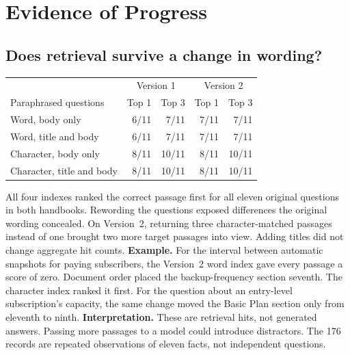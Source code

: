 \documentclass[10pt,letterpaper]{article}
\begin{document}
\section{Evidence of Progress}
\subsection{Does retrieval survive a change in wording?}
\begin{center}
\begin{tabular}{lrrrr}\toprule
 & \multicolumn{2}{c}{Version 1} & \multicolumn{2}{c}{Version 2}\\
Paraphrased questions & Top 1 & Top 3 & Top 1 & Top 3\\\midrule
Word, body only & 6/11 & 7/11 & 7/11 & 7/11\\
Word, title and body & 6/11 & 7/11 & 7/11 & 7/11\\
Character, body only & 8/11 & 10/11 & 8/11 & 10/11\\
Character, title and body & 8/11 & 10/11 & 8/11 & 10/11\\\bottomrule
\end{tabular}
\end{center}
All four indexes ranked the correct passage first for all eleven original questions in both handbooks. Rewording the questions exposed differences the original wording concealed. On Version~2, returning three character-matched passages instead of one brought two more target passages into view. Adding titles did not change aggregate hit counts.
\textbf{Example.} For the interval between automatic snapshots for paying subscribers, the Version~2 word index gave every passage a score of zero. Document order placed the backup-frequency section seventh. The character index ranked it first. For the question about an entry-level subscription's capacity, the same change moved the Basic Plan section only from eleventh to ninth.
\textbf{Interpretation.} These are retrieval hits, not generated answers. Passing more passages to a model could introduce distractors. The 176 records are repeated observations of eleven facts, not independent questions.
\end{document}
